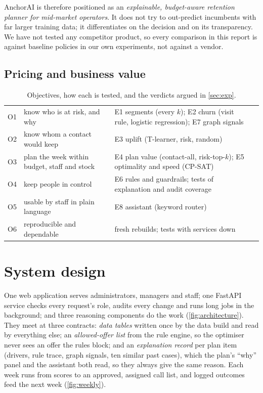 \documentclass[paper=a4, fontsize=11pt, open=any, parskip=half-,
  headings=small, numbers=noenddot, captions=tableheading, toc=flat]{scrreprt}
\begin{document}
AnchorAI is therefore positioned as an \emph{explainable, budget-aware retention planner for mid-market operators}. It does not try to out-predict incumbents with far larger training data; it differentiates on the decision and on its transparency. We have not tested any competitor product, so every comparison in this report is against baseline policies in our own experiments, not against a vendor.

\subsection{Pricing and business value}
\label{sec:pricing}


\begin{table}[!htb]
  \caption{Objectives, how each is tested, and the verdicts argued in \cref{sec:exp}.}
  \label{tab:scorecard}
  \begin{tabularx}{\linewidth}{@{}l L L l@{}}
    \toprule
    &  &  &  \\
    \midrule
    O1 & know who is at risk, and why & E1 segments (every $k$); E2 churn (visit rule, logistic regression); E7 graph signals &  \\
    O2 & know whom a contact would keep & E3 uplift (T-learner, risk, random) &  \\
    O3 & plan the week within budget, staff and stock & E4 plan value (contact-all, risk-top-$k$); E5 optimality and speed (CP-SAT) &  \\
    O4 & keep people in control & E6 rules and guardrails; tests of explanation and audit coverage &  \\
    O5 & usable by staff in plain language & E8 assistant (keyword router) &  \\
    O6 & reproducible and dependable & fresh rebuilds; tests with services down &  \\
    \bottomrule
  \end{tabularx}
\end{table}

\section{System design}
\label{sec:design}

One web application serves administrators, managers and staff; one FastAPI service checks every request's role, audits every change and runs long jobs in the background; and three reasoning components do the work (\cref{fig:architecture}). They meet at three contracts: \emph{data tables} written once by the data build and read by everything else; an \emph{allowed-offer list} from the rule engine, so the optimiser never sees an offer the rules block; and an \emph{explanation record} per plan item (drivers, rule trace, graph signals, ten similar past cases), which the plan's \enquote{why} panel and the assistant both read, so they always give the same reason. Each week runs from scores to an approved, assigned call list, and logged outcomes feed the next week (\cref{fig:weekly}).
\end{document}
